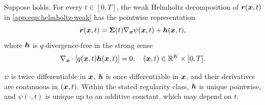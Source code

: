 \begin{theorem}\label{app:thm:helm-gaussian}
    Suppose  holds.
    For every $t\in[0,T]$, the weak Helmholtz decomposition of $\boldsymbol{r}(\boldsymbol{x}, t)$ in \cref{app:eqn:helmholtz-weak} has the pointwise representation
    \begin{equation*}
    \boldsymbol{r}(\boldsymbol{x},t)=\boldsymbol{\Sigma}(t)\nabla_{\boldsymbol{x}}\psi(\boldsymbol{x},t)+\boldsymbol{h}(\boldsymbol{x},t),
    \end{equation*}
    where $\boldsymbol{h}$ is $q$-divergence-free in the strong sense
    \begin{equation*}
    \nabla_{\boldsymbol{x}}\cdot[q(\boldsymbol{x},t)\boldsymbol{h}(\boldsymbol{x},t)]=0, \quad (\boldsymbol{x}, t) \in \mathbb{R}^K \times [0, T].
\end{equation*}

    $\psi$ is twice differentiable in $\boldsymbol{x}$, $\boldsymbol{h}$ is once differentiable in $\boldsymbol{x}$, and their derivatives are continuous in $(\boldsymbol{x}, t)$.
    Within the stated regularity class, $\boldsymbol{h}$ is unique pointwise, and $\psi(\cdot,t)$ is unique up to an additive constant, which may depend on $t$.
\end{theorem}
